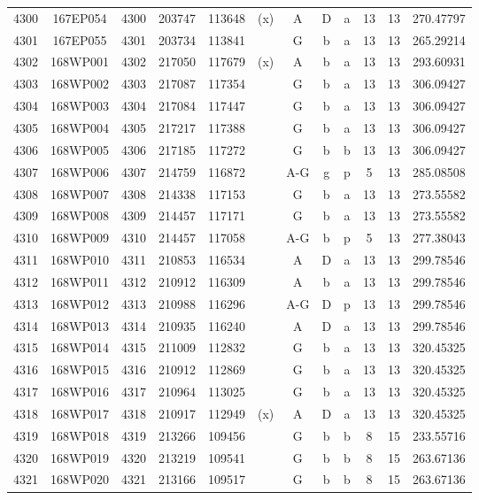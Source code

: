 \begin{tabular}{|*{12}{c|}}
4300 & 167EP054 & 4300 & 203747 & 113648 & (x) & A & D & a & 13 & 13 & 270.47797 \\ 
4301 & 167EP055 & 4301 & 203734 & 113841 &  & G & b & a & 13 & 13 & 265.29214 \\ 
4302 & 168WP001 & 4302 & 217050 & 117679 & (x) & A & b & a & 13 & 13 & 293.60931 \\ 
4303 & 168WP002 & 4303 & 217087 & 117354 &  & G & b & a & 13 & 13 & 306.09427 \\ 
4304 & 168WP003 & 4304 & 217084 & 117447 &  & G & b & a & 13 & 13 & 306.09427 \\ 
4305 & 168WP004 & 4305 & 217217 & 117388 &  & G & b & a & 13 & 13 & 306.09427 \\ 
4306 & 168WP005 & 4306 & 217185 & 117272 &  & G & b & b & 13 & 13 & 306.09427 \\ 
4307 & 168WP006 & 4307 & 214759 & 116872 &  & A-G & g & p & 5 & 13 & 285.08508 \\ 
4308 & 168WP007 & 4308 & 214338 & 117153 &  & G & b & a & 13 & 13 & 273.55582 \\ 
4309 & 168WP008 & 4309 & 214457 & 117171 &  & G & b & a & 13 & 13 & 273.55582 \\ 
4310 & 168WP009 & 4310 & 214457 & 117058 &  & A-G & b & p & 5 & 13 & 277.38043 \\ 
4311 & 168WP010 & 4311 & 210853 & 116534 &  & A & D & a & 13 & 13 & 299.78546 \\ 
4312 & 168WP011 & 4312 & 210912 & 116309 &  & A & b & a & 13 & 13 & 299.78546 \\ 
4313 & 168WP012 & 4313 & 210988 & 116296 &  & A-G & D & p & 13 & 13 & 299.78546 \\ 
4314 & 168WP013 & 4314 & 210935 & 116240 &  & A & D & a & 13 & 13 & 299.78546 \\ 
4315 & 168WP014 & 4315 & 211009 & 112832 &  & G & b & a & 13 & 13 & 320.45325 \\ 
4316 & 168WP015 & 4316 & 210912 & 112869 &  & G & b & a & 13 & 13 & 320.45325 \\ 
4317 & 168WP016 & 4317 & 210964 & 113025 &  & G & b & a & 13 & 13 & 320.45325 \\ 
4318 & 168WP017 & 4318 & 210917 & 112949 & (x) & A & D & a & 13 & 13 & 320.45325 \\ 
4319 & 168WP018 & 4319 & 213266 & 109456 &  & G & b & b & 8 & 15 & 233.55716 \\ 
4320 & 168WP019 & 4320 & 213219 & 109541 &  & G & b & b & 8 & 15 & 263.67136 \\ 
4321 & 168WP020 & 4321 & 213166 & 109517 &  & G & b & b & 8 & 15 & 263.67136 \\ 

\end{tabular}
